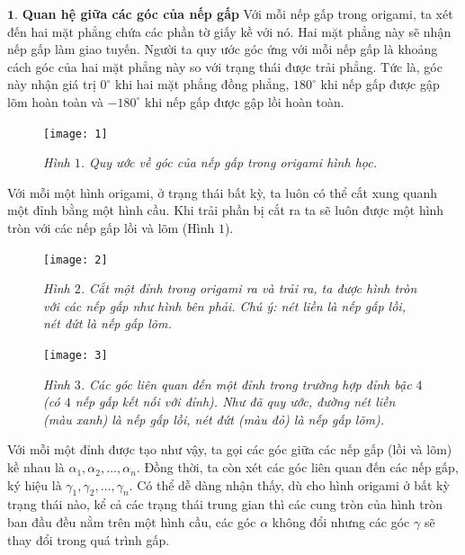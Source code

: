 \begin{multicols}{2}
	\setlength{\abovedisplayskip}{4pt}
	\setlength{\belowdisplayskip}{4pt}
	$\pmb{1.}$ \textbf{\color{toanhocdoisong}Quan hệ giữa các góc của nếp gấp}
	\vskip 0.1cm	
	Với mỗi nếp gấp trong origami, ta xét đến hai mặt phẳng chứa các phần tờ giấy kề với nó. Hai mặt phẳng này sẽ nhận nếp gấp làm giao tuyến. Người ta quy ước góc ứng với mỗi nếp gấp là khoảng cách góc của hai mặt phẳng này so với trạng thái được trải phẳng. Tức là, góc này nhận giá trị $0^\circ$ khi hai mặt phẳng đồng phẳng, $180^\circ$ khi nếp gấp được gập lõm hoàn toàn và $-180^\circ$ khi nếp gấp được gập lồi hoàn toàn.
		\begin{figure}[H]
		\vspace*{-5pt}
		\centering
		\captionsetup{labelformat= empty, justification=centering}
		\texttt{[image: 1]}
		\caption{\small\textit{\color{duongvaotoanhoc}Hình $1$. Quy ước về góc của nếp gấp trong origami hình học.}}
		\vspace*{-10pt}
	\end{figure}
	Với mỗi một hình origami, ở trạng thái bất kỳ, ta luôn có thể cắt xung quanh một đỉnh bằng một hình cầu. Khi trải phần bị cắt ra ta sẽ luôn được một hình tròn với các nếp gấp lồi và lõm (Hình $1$).
		\begin{figure}[H]
		\vspace*{-5pt}
		\centering
		\captionsetup{labelformat= empty, justification=centering}
		\texttt{[image: 2]}
		\caption{\small\textit{\color{duongvaotoanhoc}Hình $2$. Cắt một đỉnh trong origami ra và trải ra, ta được hình tròn với các nếp gấp như hình bên phải. Chú ý: nét liền là nếp gấp lồi, nét đứt là nếp gấp lõm.}}
		\vspace*{-10pt}
	\end{figure}
		\begin{figure}[H]
		\vspace*{-5pt}
		\centering
		\captionsetup{labelformat= empty, justification=centering}
		\texttt{[image: 3]}
		\caption{\small\textit{\color{duongvaotoanhoc}Hình $3$. Các góc liên quan đến một đỉnh trong trường hợp đỉnh bậc $4$ (có $4$ nếp gấp kết nối với đỉnh). Như đã quy ước, đường nét liền (màu xanh) là nếp gấp lồi, nét đứt (màu đỏ) là nếp gấp lõm).}}
		\vspace*{-10pt}
	\end{figure}
	Với mỗi một đỉnh được tạo như vậy, ta gọi các góc giữa các nếp gấp (lồi và lõm) kề nhau là $\alpha_1, \alpha_2,\ldots,\alpha_n$. Đồng thời, ta còn xét các góc liên quan đến các nếp gấp, ký hiệu là $\gamma_1, \gamma_2,\ldots,\gamma_n$. Có thể dễ dàng nhận thấy, dù cho hình origami ở bất kỳ trạng thái nào, kể cả các trạng thái trung gian thì các cung tròn của hình tròn ban đầu đều nằm trên một \linebreak hình cầu, các góc $\alpha$ không đổi nhưng các góc $\gamma$ sẽ thay đổi trong quá trình gấp.

\end{multicols}

